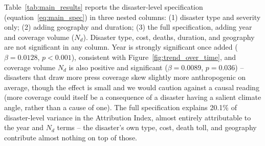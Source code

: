 \documentclass[12pt]{article}
\begin{document}
Table~\ref{tab:main_results} reports the disaster-level specification
(equation~\ref{eq:main_spec}) in three nested columns: (1) disaster type
and severity only; (2) adding geography and duration; (3) the full
specification, adding year and coverage volume ($N_d$). Disaster type,
cost, deaths, duration, and geography are not significant in any column.
Year is strongly significant once added ($\beta=0.0128$, $p<0.001$),
consistent with Figure~\ref{fig:trend_over_time}, and coverage volume
$N_d$ is also positive and significant ($\beta=0.0089$, $p=0.036$) --
disasters that draw more press coverage skew slightly more anthropogenic
on average, though the effect is small and we would caution against a
causal reading (more coverage could itself be a consequence of a disaster
having a salient climate angle, rather than a cause of one). The full
specification explains 20.1\% of disaster-level variance in the Attribution
Index, almost entirely attributable to the year and $N_d$ terms -- the
disaster's own type, cost, death toll, and geography contribute almost
nothing on top of those.
\end{document}

